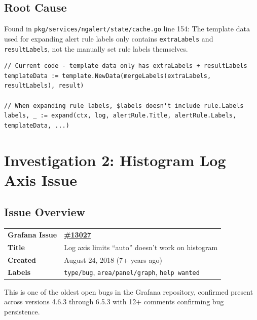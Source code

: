 \documentclass[
    11pt,
    a4paper,
    oneside,
    abstract=on,
    parskip=full+,
    headings=big,
    bibliography=totoc
]{scrartcl}
\newcommand{\code}[1]{\texttt{#1}}
\begin{document}
\subsection{Root Cause}

\begin{keyfinding}
    Found in \code{pkg/services/ngalert/state/cache.go} line 154: The template data used for expanding alert rule labels only contains \code{extraLabels} and \code{resultLabels}, not the manually set rule labels themselves.
\end{keyfinding}

\begin{verbatim}
// Current code - template data only has extraLabels + resultLabels
templateData := template.NewData(mergeLabels(extraLabels, resultLabels), result)

// When expanding rule labels, $labels doesn't include rule.Labels
labels, _ := expand(ctx, log, alertRule.Title, alertRule.Labels, templateData, ...)
\end{verbatim}

\newpage
\section{Investigation 2: Histogram Log Axis Issue}

\subsection{Issue Overview}

\begin{tabular}{|l|p{10cm}|}
    \hline
    \rowcolor{light}
    \textbf{Grafana Issue} & \textbf{\href{https://github.com/grafana/grafana/issues/13027}{\#13027}} \\
    \textbf{Title} & Log axis limits ``auto'' doesn't work on histogram \\
    \textbf{Created} & August 24, 2018 (7+ years ago) \\
    \textbf{Labels} & \texttt{type/bug}, \texttt{area/panel/graph}, \texttt{help wanted} \\
    \hline
\end{tabular}

\begin{important}
    This is one of the oldest open bugs in the Grafana repository, confirmed present across versions 4.6.3 through 6.5.3 with 12+ comments confirming bug persistence.
\end{important}
\end{document}
